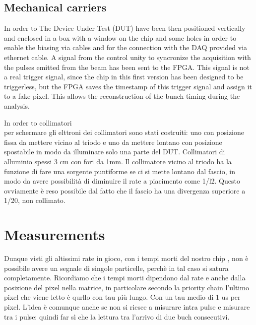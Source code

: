    \subsection{Mechanical carriers}
      In order to 
      The Device Under Test (DUT) have been then positioned vertically and enclosed in a box with a window on the chip and some holes in order to enable the biasing via cables and for the connection with the DAQ provided via ethernet cable. 
      A signal from the control unity to syncronize the acquisition with the pulses emitted from the beam has been sent to the FPGA. This signal is not a real trigger signal, since the chip in this first version has been designed to be triggerless, but the FPGA saves the timestamp of this trigger signal and assign it to a fake pixel. This allows the reconstruction of the bunch timing during the analysis. 

      In order to 
      collimatori\\
      per schermare gli elttroni dei collimatori sono stati costruiti: uno con posizione fissa da mettere vicino al triodo e uno da mettere lontano con posizione spostabile in modo da illuminare solo una parte del DUT. 
      Collimatori di alluminio spessi 3 cm con fori da 1mm. Il collimatore vicino al triodo ha la funzione di fare una sorgente puntiforme se ci si mette lontano dal fascio, in modo da avere possibilità di diminuire il rate a piacimento come 1/l2.
      Questo ovviamente è reso possibile dal fatto che il fascio ha una divergenza superiore a 1/20, non collimato. 
   


\section{Measurements}

   Dunque visti gli altissimi rate in gioco, con i tempi morti del nostro chip , non è possibile avere un segnale di singole particelle, perchè in tal caso si satura completamente. 
   Ricordiamo che i tempi morti dipendono dal rate e anche dalla posizione del pixel nella matrice, in particolare secondo la priority chain l'ultimo pixel che viene letto è qurllo con tau più lungo. Con un tau medio di 1 us per pixel. 
   L'idea è comunque anche se non si riesce a misurare intra pulse e misurare tra i pulse: quindi far sì che la lettura tra l'arrivo di due buch consecutivi. 

